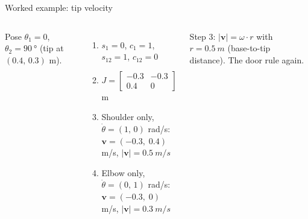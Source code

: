 \documentclass[aspectratio=169,10pt]{beamer}
\newcommand{\arm}[3]{%
  \draw[#3] (0,0) -- ++(#1:2.4) coordinate (E) -- ++(#1+#2:1.8) coordinate (T);
  \node[jnt] at (0,0) {}; \node[jnt] at (E) {}; \fill[mkOrange] (T) circle (1.6pt);}
\newcommand{\base}{\fill[pattern=north east lines,pattern color=mkGray] (-.35,-.25) rectangle (.35,-.08);
  \draw[mkGray,line width=.8pt] (-.35,-.08) -- (.35,-.08);}
\begin{document}
\begin{frame}[t]{Worked example: tip velocity}
\begin{columns}[T,onlytextwidth]
\small
Pose $\theta_1=0$, $\theta_2=\SI{90}{\degree}$ (tip at $(0.4,\,0.3)$ m).
\begin{enumerate}
\item $s_1=0$, $c_1=1$, $s_{12}=1$, $c_{12}=0$
\item $J=\begin{bmatrix} -0.3 & -0.3\\ 0.4 & 0\end{bmatrix}$ m
\item Shoulder only, $\dot\theta=(1,\,0)$ rad/s:\\ $\bm v=(-0.3,\;0.4)$ m/s, $|\bm v|=\SI{0.5}{m/s}$
\item Elbow only, $\dot\theta=(0,\,1)$ rad/s:\\ $\bm v=(-0.3,\;0)$ m/s, $|\bm v|=\SI{0.3}{m/s}$
\end{enumerate}
\begin{notebox}
Step 3: $|\bm v| = \omega\cdot r$ with $r=\SI{0.5}{m}$ (base-to-tip distance). The door rule again.
\end{notebox}
\centering
{}
\end{columns}
\end{frame}
\end{document}
